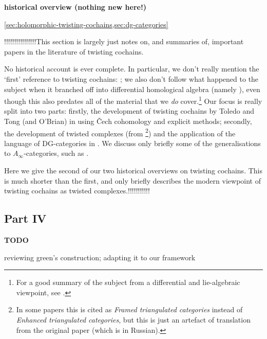             {\color{red}\textbf{historical overview (nothing new here!)}}

            \cref{sec:holomorphic-twisting-cochains,sec:dg-categories}



            {\color{red}!!!!!!!!!!!!!!!!}This section is largely just notes on, and summaries of, important papers in the literature of twisting cochains.

            No historical account is ever complete.
            In particular, we don't really mention the `first' reference to twisting cochains: \cite{Brown:1959ia}; we also don't follow what happened to the subject when it branched off into differential homological algebra (namely \cite{Moore:70dh}), even though this also predates all of the material that we \textit{do} cover.\footnote{For a good summary of the subject from a differential and lie-algebraic viewpoint, see \cite{Stasheff:2009cc}.}
            Our focus is really split into two parts: firstly, the development of twisting cochains by Toledo and Tong (and O'Brian) in \cite{Toledo:1976gy,Toledo:1978tq,OBrian:1981vs} using Čech cohomology and explicit methods; secondly, the development of twisted complexes (from \cite{Bondal:1991un}\footnote{In some papers this is cited as \textit{Framed triangulated categories} instead of \textit{Enhanced triangulated categories}, but this is just an artefact of translation from the original paper (which is in Russian).}) and the application of the language of DG-categories in \cite{Block:2015vk,Wei:2016tv,Wei:2016ip}.
            We discuss only briefly some of the generalisations to $A_\infty$-categories, such as \cite{Faonte:2015vc}.

            Here we give the second of our two historical overviews on twisting cochains.
            This is much shorter than the first, and only briefly describes the modern viewpoint of twisting cochains as twisted complexes.{\color{red}!!!!!!!!!!!}
        

        \subsection*{Part IV} %
        \label{sub:part_iv}

            {\color{red}\textbf{TODO}}

            {\color{red}reviewing green's construction; adapting it to our framework}
        
